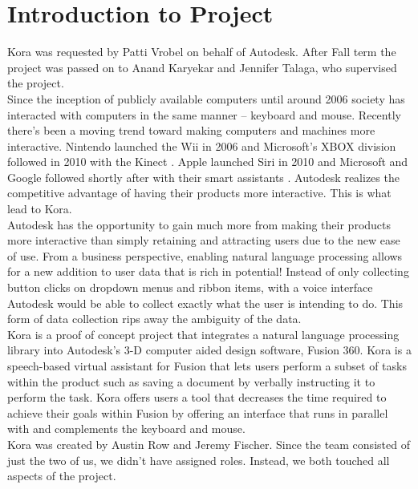 \documentclass[onecolumn, draftclsnofoot,10pt, compsoc]{IEEEtran}
\newcommand{\newpara}{\\[0.1in]}
\begin{document}

\section{Introduction to Project}
	Kora was requested by Patti Vrobel on behalf of Autodesk.
	After Fall term the project was passed on to Anand Karyekar and Jennifer Talaga, who supervised the project.
	\newpara
	Since the inception of publicly available computers until around 2006 society has interacted with computers in the same manner – keyboard and mouse.
	Recently there’s been a moving trend toward making computers and machines more interactive.
	Nintendo launched the Wii in 2006 and Microsoft’s XBOX division followed in 2010 with the Kinect \cite{wii}\cite{kinect}.
	 Apple launched Siri in 2010 and Microsoft and Google followed shortly after with their smart assistants \cite{siri}.
	 Autodesk realizes the competitive advantage of having their products more interactive.
	 This is what lead to Kora.
	\newpara
	Autodesk has the opportunity to gain much more from making their products more interactive than simply retaining and attracting users due to the new ease of use.
	From a business perspective, enabling natural language processing allows for a new addition to user data that is rich in potential!
	Instead of only collecting button clicks on dropdown menus and ribbon items, with a voice interface Autodesk would be able to collect exactly what the user is intending to do.
	This form of data collection rips away the ambiguity of the data.
	\newpara
	Kora is a proof of concept project that integrates a natural language processing library into Autodesk's 3-D computer aided design software, Fusion 360.
	Kora is a speech-based virtual assistant for Fusion that lets users perform a subset of tasks within the product such as saving a document by verbally instructing it to perform the task.
	Kora offers users a tool that decreases the time required to achieve their goals within Fusion by offering an interface that runs in parallel with and complements the keyboard and mouse.
	\newpara
	Kora was created by Austin Row and Jeremy Fischer.
	Since the team consisted of just the two of us, we didn't have assigned roles.
	Instead, we both touched all aspects of the project.
\end{document}
